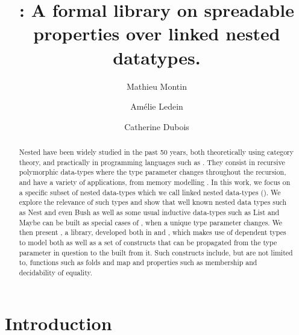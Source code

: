 \documentclass[a4paper,UKenglish,cleveref, autoref, thm-restate]{lipics}
\title{\libName: A formal library on spreadable properties over linked nested datatypes.}
\author{Mathieu Montin}{Université de Lorraine, Loria, CNRS, Inria, France}{mathieu.montin@loria.fr}{https://orcid.org/0000-0003-2219-9359}{}
\author{Amélie Ledein}{Université Paris Saclay, ENS Paris Saclay, LMF, CNRS, Inria, France}{amelie.ledein@inria.fr}{https://orcid.org/0000-0002-8122-7092}{}
\author{Catherine Dubois}{ENSIIE, IP Paris, Samovar, France}{catherine.dubois@ensiie.fr}{https://orcid.org/0000-0002-9477-8109}{}
\begin{document}
\maketitle

\begin{abstract}
Nested \datatypes have been widely studied in the past 50 years, both theoretically using category theory, and practically in programming languages such as \haskell. They consist in recursive polymorphic data-types where the type parameter changes throughout the recursion, and have a variety of applications, from memory modelling . In this work, we focus on a specific subset of nested data-types which we call linked nested data-types (\linear). We explore the relevance of such types and show that well known nested data types such as Nest and even Bush as well as some usual inductive data-types such as List and Maybe can be built as special cases of \linear, when a unique type parameter changes. We then present \libName, a library, developed both in \agda and \coq, which makes use of dependent types to model both \linear as well as a set of constructs that can be propagated from the type parameter in question to the \linear built from it. Such constructs include, but are not limited to, functions such as folds and map and properties such as membership and decidability of equality.
\end{abstract}

\newpage

\section{Introduction}\label{sec:intro}

\end{document}
